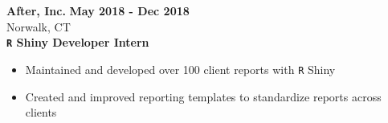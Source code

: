 \documentclass{article}
\newenvironment{innerlist}[1][\enskip\textbullet]%
        {\begin{itemize}[#1,leftmargin=*,parsep=0pt,itemsep=0pt,topsep=0pt,partopsep=0pt]}
        {\end{itemize}}
\begin{document}
\textbf{After, Inc.} \hfill {\textbf{May 2018 - Dec 2018}} \\
Norwalk, CT\\
\textbf{\texttt{R} Shiny Developer Intern}
\begin{innerlist}
  \item Maintained and developed over 100 client reports with \verb|R| Shiny
  \item Created and improved reporting templates to standardize reports across clients
\end{innerlist}

\end{document}
